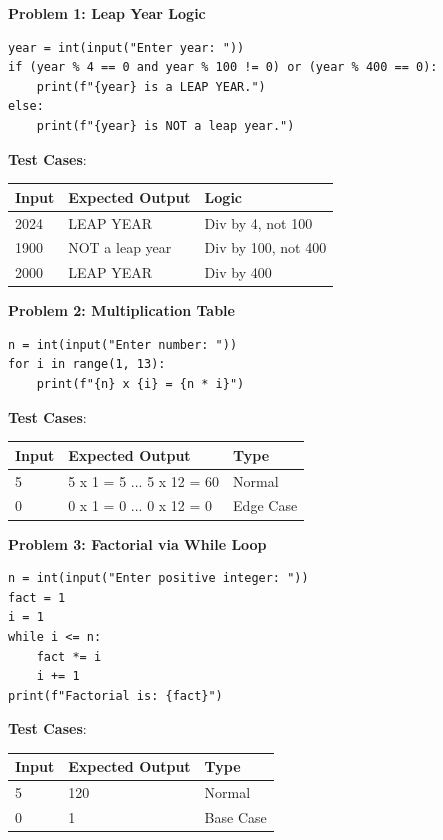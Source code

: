 \begin{solutionbox}

\noindent\textbf{Problem 1: Leap Year Logic}
\begin{lstlisting}[language=Python3]
year = int(input("Enter year: "))
if (year % 4 == 0 and year % 100 != 0) or (year % 400 == 0):
    print(f"{year} is a LEAP YEAR.")
else:
    print(f"{year} is NOT a leap year.")
\end{lstlisting}
\textbf{Test Cases}:
\begin{tabular}{|l|l|l|}
\hline Input & Expected Output & Logic \\
\hline 2024 & LEAP YEAR & Div by 4, not 100 \\
\hline 1900 & NOT a leap year & Div by 100, not 400 \\
\hline 2000 & LEAP YEAR & Div by 400 \\
\hline
\end{tabular}

\vspace{10pt}
\noindent\textbf{Problem 2: Multiplication Table}
\begin{lstlisting}[language=Python3]
n = int(input("Enter number: "))
for i in range(1, 13):
    print(f"{n} x {i} = {n * i}")
\end{lstlisting}
\textbf{Test Cases}:
\begin{tabular}{|l|l|l|}
\hline Input & Expected Output & Type \\
\hline 5 & 5 x 1 = 5 ... 5 x 12 = 60 & Normal \\
\hline 0 & 0 x 1 = 0 ... 0 x 12 = 0 & Edge Case \\
\hline
\end{tabular}

\vspace{10pt}
\noindent\textbf{Problem 3: Factorial via While Loop}
\begin{lstlisting}[language=Python3]
n = int(input("Enter positive integer: "))
fact = 1
i = 1
while i <= n:
    fact *= i
    i += 1
print(f"Factorial is: {fact}")
\end{lstlisting}
\textbf{Test Cases}:
\begin{tabular}{|l|l|l|}
\hline Input & Expected Output & Type \\
\hline 5 & 120 & Normal \\
\hline 0 & 1 & Base Case \\
\hline
\end{tabular}


\end{solutionbox}
